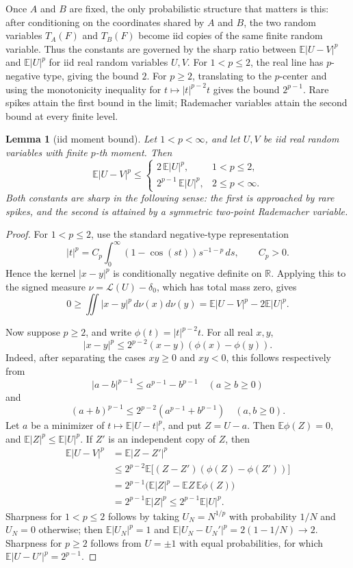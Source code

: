 \documentclass[11pt]{article}
\newtheorem{lemma}{Lemma}
\newcommand{\E}{\mathbb E}
\newcommand{\R}{\mathbb R}
\begin{document}
Once \(A\) and \(B\) are fixed, the only probabilistic structure that matters is this: after conditioning on the coordinates shared by \(A\) and \(B\), the two random variables \(T_A(F)\) and \(T_B(F)\) become iid copies of the same finite random variable.  Thus the constants are governed by the sharp ratio between \(\E|U-V|^p\) and \(\E|U|^p\) for iid real random variables \(U,V\).  For \(1<p\leq2\), the real line has \(p\)-negative type, giving the bound \(2\).  For \(p\geq2\), translating to the \(p\)-center and using the monotonicity inequality for \(t\mapsto |t|^{p-2}t\) gives the bound \(2^{p-1}\).  Rare spikes attain the first bound in the limit; Rademacher variables attain the second bound at every finite level.

\begin{lemma}[iid moment bound]\label{lem:iid}
Let \(1<p<\infty\), and let \(U,V\) be iid real random variables with finite \(p\)-th moment.  Then
\[
 \E|U-V|^p \leq
 \begin{cases}
 2\,\E|U|^p, & 1<p\leq2,\\
 2^{p-1}\,\E|U|^p, & 2\leq p<\infty.
 \end{cases}
\]
Both constants are sharp in the following sense: the first is approached by rare spikes, and the second is attained by a symmetric two-point Rademacher variable.
\end{lemma}

\begin{proof}
For \(1<p\leq2\), use the standard negative-type representation
\[
 |t|^p=C_p\int_0^\infty (1-\cos(st))s^{-1-p}\,ds,\qquad C_p>0.
\]
Hence the kernel \(|x-y|^p\) is conditionally negative definite on \(\R\).  Applying this to the signed measure \(\nu=\mathcal L(U)-\delta_0\), which has total mass zero, gives
\[
 0\geq\iint |x-y|^p\,d\nu(x)d\nu(y)
   = \E|U-V|^p-2\E|U|^p.
\]

Now suppose \(p\geq2\), and write \(\phi(t)=|t|^{p-2}t\).  For all real \(x,y\),
\[
 |x-y|^p\leq 2^{p-2}(x-y)(\phi(x)-\phi(y)).
\]
Indeed, after separating the cases \(xy\geq0\) and \(xy<0\), this follows respectively from
\[
 |a-b|^{p-1}\leq a^{p-1}-b^{p-1}\quad(a\geq b\geq0)
\]
and
\[
 (a+b)^{p-1}\leq2^{p-2}(a^{p-1}+b^{p-1})\quad(a,b\geq0).
\]
Let \(a\) be a minimizer of \(t\mapsto\E|U-t|^p\), and put \(Z=U-a\).  Then \(\E\phi(Z)=0\), and \(\E|Z|^p\leq\E|U|^p\).  If \(Z'\) is an independent copy of \(Z\), then
\[
\begin{aligned}
\E|U-V|^p
&=\E|Z-Z'|^p \\
&\leq 2^{p-2}\E\bigl[(Z-Z')(\phi(Z)-\phi(Z'))\bigr]\\
&=2^{p-1}\bigl(\E|Z|^p-\E Z\,\E\phi(Z)\bigr)\\
&=2^{p-1}\E|Z|^p
\leq 2^{p-1}\E|U|^p.
\end{aligned}
\]
Sharpness for \(1<p\leq2\) follows by taking \(U_N=N^{1/p}\) with probability \(1/N\) and \(U_N=0\) otherwise; then \(\E|U_N|^p=1\) and \(\E|U_N-U_N'|^p=2(1-1/N)\to2\).  Sharpness for \(p\geq2\) follows from \(U=\pm1\) with equal probabilities, for which \(\E|U-U'|^p=2^{p-1}\).
\end{proof}
\end{document}
